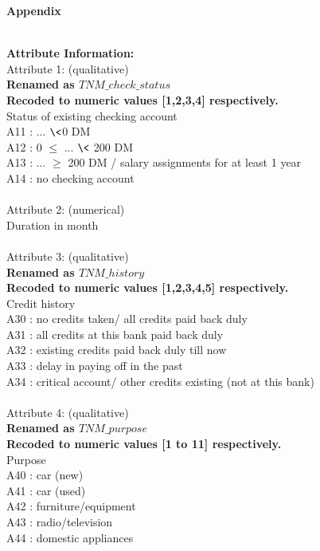 \documentclass{article}\usepackage[]{graphicx}\usepackage[]{color}
\begin{document}
\newpage
\begin{flushleft}
{\Large\textbf{Appendix}}\\\\
\end{flushleft}

\textbf{Attribute Information:}\\
Attribute 1: (qualitative)\\
\textbf{Renamed as \textit{$TNM\_ check\_ status$}\\
Recoded to numeric values [1,2,3,4] respectively.}\\
Status of existing checking account\\
A11 : ... $\< $0 DM\\
A12 : 0 $\leq$ ... $\<$ 200 DM\\
A13 : ... $\geq$ 200 DM / salary assignments for at least 1 year\\
A14 : no checking account\\
\\
Attribute 2: (numerical)\\
Duration in month\\
\\
Attribute 3: (qualitative) \\
\textbf{Renamed as \textit{$TNM\_ history$}}\\
\textbf{Recoded to numeric values [1,2,3,4,5] respectively.}\\
Credit history\\
A30 : no credits taken/ all credits paid back duly\\
A31 : all credits at this bank paid back duly\\
A32 : existing credits paid back duly till now\\
A33 : delay in paying off in the past\\
A34 : critical account/ other credits existing (not at this bank)\\
\\
Attribute 4: (qualitative)\\
\textbf{Renamed as \textit{$TNM\_ purpose$}}\\
\textbf{Recoded to numeric values [1 to 11] respectively.}\\
Purpose\\
A40 : car (new)\\
A41 : car (used)\\
A42 : furniture/equipment\\
A43 : radio/television\\
A44 : domestic appliances\\
\end{document}
